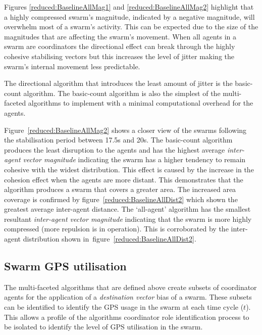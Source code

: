 Figures \ref{reduced:BaselineAllMag1} and \ref{reduced:BaselineAllMag2} highlight that a highly compressed swarm's magnitude, indicated by a negative magnitude, will overwhelm most of a swarm's activity. This can be expected due to the size of the magnitudes that are affecting the swarm's movement. When all agents in a swarm are coordinators the directional effect can break through the highly cohesive stabilising vectors but this increases the level of jitter making the swarm's internal movement less predictable.

The directional algorithm that introduces the least amount of jitter is the basic-count algorithm. The basic-count algorithm is also the simplest of the multi-faceted algorithms to implement with a minimal computational overhead for the agents. 

Figure~\ref{reduced:BaselineAllMag2} shows a closer view of the swarms following the stabilisation period between 17.5s and 20s. The basic-count algorithm produces the least disruption to the agents and has the highest average \textit{inter-agent vector magnitude} indicating the swarm has a higher tendency to remain cohesive with the widest distribution. This effect is caused by the increase in the cohesion effect when the agents are more distant. This demonstrates that the algorithm produces a swarm that covers a greater area. The increased area coverage is confirmed by figure~\ref{reduced:BaselineAllDist2} which shown the greatest average inter-agent distance. The `all-agent' algorithm has the smallest resultant \textit{inter-agent vector magnitude} indicating that the swarm is more highly compressed (more repulsion is in operation). This is corroborated by the inter-agent distribution shown in~figure~\ref{reduced:BaselineAllDist2}.

\subsection{Swarm GPS utilisation\label{section:compareGPSUages1}}
The multi-faceted algorithms that are defined above create subsets of coordinator agents for the application of a \textit{destination vector} bias of a swarm. These subsets can be identified to identify the GPS usage in the swarm at each time cycle ($t$). This allows a profile of the algorithms coordinator role identification process to be isolated to identify the level of GPS utilisation in the swarm.

